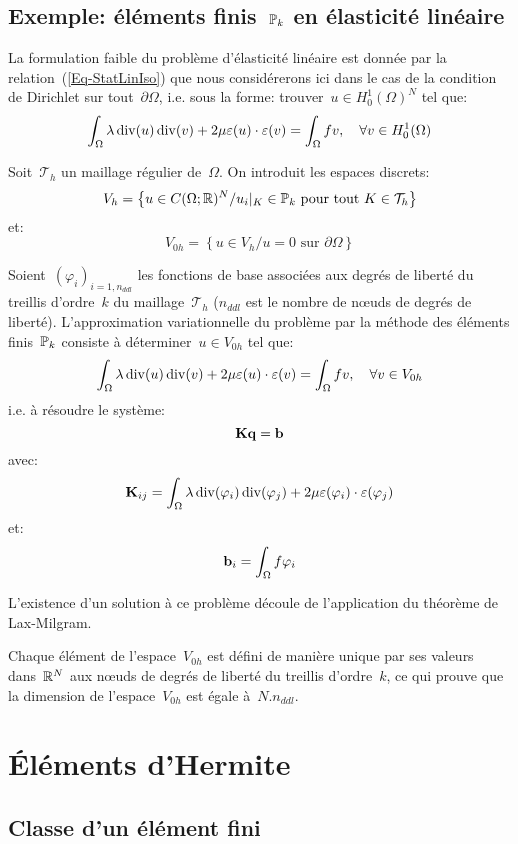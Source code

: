 \medskip
\subsection{Exemple: éléments finis~$\mathbb P_k$ en élasticité linéaire}

La formulation faible du problème d'élasticité linéaire est donnée par la relation~(\ref{Eq-StatLinIso}) que nous considérerons ici dans le cas de la condition de Dirichlet sur tout~$\partial\Omega$, i.e. sous la forme: trouver~$u\in H^1_0(\Omega)^N$ tel que:
\[
\displaystyle\int_\Omega \lambda \operatorname{div}(u)\operatorname{div}(v)+2\mu\varepsilon(u)\cdot\varepsilon(v) = \displaystyle\int_\Omega fv, \quad \forall v\in H^1_0(\Omega)
\]

Soit~$\mathcal{T}_h$ un maillage régulier de~$\Omega$. On introduit les espaces discrets:
\[ V_h=\left\{ u\in C(\Omega;\mathbb R)^N/ u_i|_K\in\mathbb P_k \text{ pour tout }K\in\mathcal{T}_h \right\} \]
et:
\[ V_{0h} = \left\{ u\in V_h/ u=0 \text{ sur }\partial\Omega\right\} \]

Soient~$(\varphi_i)_{i=1,n_{ddl}}$ les fonctions de base associées aux degrés de liberté du treillis d'ordre~$k$ du maillage~$\mathcal{T}_h$ ($n_{ddl}$ est le nombre de nœuds de degrés de liberté). L'approximation variationnelle du problème par la méthode des éléments finis~$\mathbb P_k$ consiste à déterminer~$u\in V_{0h}$ tel que:
\[
\displaystyle\int_\Omega \lambda \operatorname{div}(u)\operatorname{div}(v)+2\mu\varepsilon(u)\cdot\varepsilon(v) = \displaystyle\int_\Omega fv, \quad \forall v\in V_{0h}
\]
i.e. à résoudre le système:
\[ \MM{K}\VV{q}=\VV{b} \]
avec:
\[ \MM{K}_{ij} = \dint_\Omega \lambda \dive(\varphi_i)\dive(\varphi_j)+2\mu\varepsilon(\varphi_i)\cdot\varepsilon(\varphi_j) \]
et:
\[ \VV{b}_i = \dint_\Omega f\varphi_i \]

L'existence d'un solution à ce problème découle de l'application du théorème de Lax-Milgram.

Chaque élément de l'espace~$V_{0h}$ est défini de manière unique par ses valeurs dans~$\mathbb R^N$ aux nœuds de degrés de liberté du treillis d'ordre~$k$, ce qui prouve que la dimension de l'espace~$V_{0h}$ est égale à~$N.n_{ddl}$.


\medskip
\section{Éléments d'Hermite}

\medskip
\subsection{Classe d'un élément fini}

